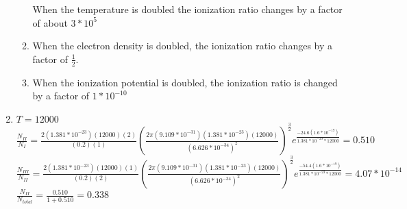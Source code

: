 \documentclass{article}
\begin{document}
\begin{enumerate}
\begin{enumerate}
        When the temperature is doubled the ionization ratio changes by a factor of about $3*10^5$
        
        \item
        
        When the electron density is doubled, the ionization ratio changes by a factor of $\frac{1}{2}$.
        
        \item
        
        When the ionization potential is doubled, the ionization ratio is changed by a factor of $1*10^{-10}$
        
    \end{enumerate}
    
    \item
    
    $T = 12000$\\
    $\frac{N_{II}}{N_{I}}=\frac{2(1.381*10^{-23})(12000)(2)}{(0.2)(1)}(\frac{2\pi (9.109*10^{-31})(1.381*10^{-23})(12000)}{(6.626*10^{-34})^2})^{\frac{3}{2}}e^{\frac{-24.6(1.6*10^{-19})}{1.381*10^{-23}*12000}}=0.510$\\
    $\frac{N_{III}}{N_{II}}=\frac{2(1.381*10^{-23})(12000)(1)}{(0.2)(2)}(\frac{2\pi (9.109*10^{-31})(1.381*10^{-23})(12000)}{(6.626*10^{-34})^2})^{\frac{3}{2}}e^{\frac{-54.4(1.6*10^{-19})}{1.381*10^{-23}*12000}}=4.07*10^{-14}$\\
    $\frac{N_{II}}{N_{total}}=\frac{0.510}{1+0.510}=0.338$\\
    
\end{enumerate}
\end{document}
